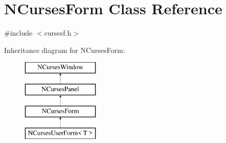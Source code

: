 \hypertarget{class_n_curses_form}{\section{N\-Curses\-Form Class Reference}
\label{class_n_curses_form}
}


{\ttfamily \#include $<$cursesf.\-h$>$}

Inheritance diagram for N\-Curses\-Form\-:\begin{figure}[H]
\begin{center}
\leavevmode
\includegraphics[height=4.000000cm]{class_n_curses_form}
\end{center}
\end{figure}
